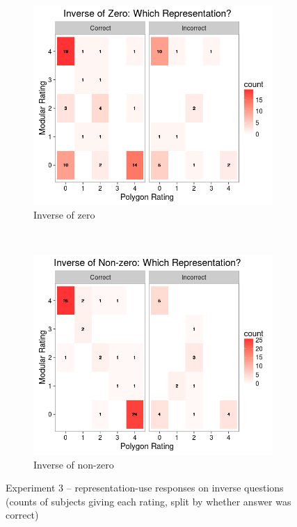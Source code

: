 \documentclass[man,10pt]{apa6}
\begin{document}
\begin{figure}
\centering
\begin{subfigure}[c]{0.45\textwidth}
\centering 
\includegraphics[width=\textwidth]{figures/3/wr_inZ.png}
\caption{Inverse of zero}
\end{subfigure}
~
\begin{subfigure}[c]{0.45\textwidth}
\centering 
\includegraphics[width=\textwidth]{figures/3/wr_inNZ.png}
\caption{Inverse of non-zero}
\end{subfigure}
\caption{Experiment 3 -- representation-use responses on inverse questions (counts of subjects giving each rating, split by whether answer was correct)}
\label{ex3_wr_in}
\end{figure}\noindent
\end{document}
